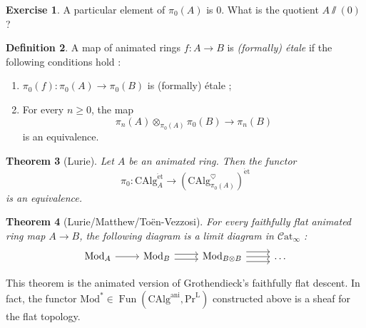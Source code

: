 \documentclass[11pt]{article}
\newtheorem{theorem}{Theorem}[section]
\theoremstyle{definition}
\newtheorem{definition}[theorem]{Definition}
\newtheorem{exercise}[theorem]{Exercise}
\newcommand{\ani}{\mathrm{ani}}
\newcommand{\CAlg}{\mathrm{CAlg}}
\newcommand{\Catinf}{\mathcal{C}\mathrm{at}_{\infty}}
\newcommand{\et}{\mathrm{\acute{e}t}}
\newcommand{\Fun}{\operatorname{Fun}}
\newcommand{\heart}{\heartsuit}
\newcommand{\Mod}{\mathrm{Mod}}
\newcommand{\PrL}{\mathrm{Pr}^{\mathrm{L}}}
\begin{document}
\begin{exercise}
    A particular element of $\pi_0(A)$ is $0$.
    What is the quotient $A\sslash(0)$ ?
\end{exercise}

\begin{definition}
    A map of animated rings $f : A \to B$ is \emph{(formally) étale} if the following conditions hold :
    \begin{enumerate}
        \item $\pi_0(f) : \pi_0(A) \to \pi_0(B)$ is (formally) étale ;
        \item For every $n \geq 0$, the map
        \[
            \pi_n(A) \otimes_{\pi_0(A)} \pi_0(B) \to \pi_n(B)
        \]
        is an equivalence.
    \end{enumerate}
\end{definition}

\begin{theorem}[Lurie]
    Let $A$ be an animated ring.
    Then the functor
    \[
        \pi_0 : \CAlg_A^{\et} \to \left(\CAlg_{\pi_0(A)}^{\heart}\right)^{\et}
    \]
    is an equivalence.
\end{theorem}

\begin{theorem}[Lurie/Matthew/Toën-Vezzosi]
    For every faithfully flat animated ring map $A \to B$, the following diagram is a limit diagram in $\Catinf$ :
    \[\begin{tikzcd}
        {\Mod_A} & {\Mod_B} & {\Mod_{B\otimes B}} & \dots
        \arrow[from=1-1, to=1-2]
        \arrow[shift left, from=1-2, to=1-3]
        \arrow[shift right, from=1-2, to=1-3]
        \arrow[from=1-3, to=1-4]
        \arrow[shift left=2, from=1-3, to=1-4]
        \arrow[shift right=2, from=1-3, to=1-4]
    \end{tikzcd}\]
\end{theorem}
This theorem is the animated version of Grothendieck's faithfully flat descent.
In fact, the functor $\Mod^* \in \Fun(\CAlg^{\ani}, \PrL)$ constructed above is a sheaf for the flat topology.
\end{document}
